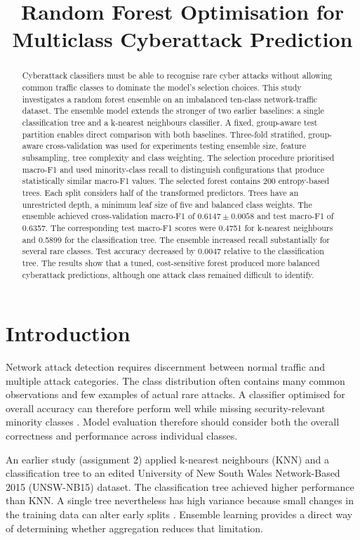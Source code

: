 \documentclass[conference]{IEEEtran}
\title{Random Forest Optimisation for Multiclass Cyberattack Prediction}
\author{\IEEEauthorblockN{Student Number: 28621883}}
\begin{document}
\maketitle

\begin{abstract}
Cyberattack classifiers must be able to recognise rare cyber attacks without allowing common traffic classes to dominate the model's selection choices. This study investigates a random forest ensemble on an imbalanced ten-class network-traffic dataset. The ensemble model extends the stronger of two earlier baselines: a single classification tree and a k-nearest neighbours classifier. A fixed, group-aware test partition enables  direct comparison with both baselines. Three-fold stratified, group-aware cross-validation was used for experiments testing  ensemble size, feature subsampling, tree complexity and class weighting. The selection procedure prioritised macro-F1 and used minority-class recall to distinguish configurations that produce statistically similar macro-F1 values. The selected forest contains 200 entropy-based trees. Each split considers half of the transformed predictors. Trees have an unrestricted depth, a minimum leaf size of five and balanced class weights. The ensemble achieved cross-validation macro-F1 of $0.6147\pm0.0058$ and test macro-F1 of 0.6357. The corresponding test macro-F1 scores were 0.4751 for k-nearest neighbours and 0.5899 for the classification tree. The ensemble increased recall substantially for several rare classes. Test accuracy decreased by 0.0047 relative to the classification tree. The results show that a tuned, cost-sensitive forest produced more balanced cyberattack predictions, although one attack class remained difficult to identify.
\end{abstract}

\section{Introduction}

Network attack detection requires discernment  between normal traffic and multiple attack categories. The class distribution often contains many common observations and few examples of actual rare attacks. A classifier optimised for overall accuracy can therefore perform well while missing security-relevant minority classes \cite{he2009learning}. Model evaluation therefore should consider both the  overall correctness and performance across individual classes.

An earlier study (assignment 2) applied k-nearest neighbours (KNN) and a classification tree to an edited University of New South Wales Network-Based 2015 (UNSW-NB15) dataset. The classification tree achieved higher performance than KNN. A single tree nevertheless has high variance because small changes in the training data can alter early splits \cite{loh2011classification}. Ensemble learning provides a direct way of determining whether aggregation reduces that limitation.
\end{document}
